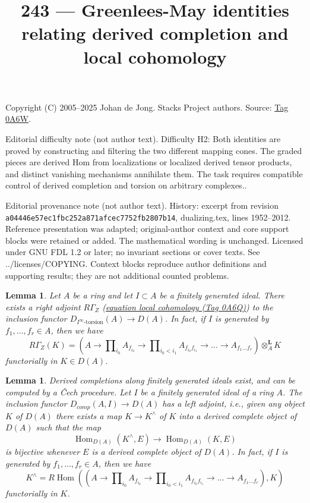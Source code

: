 \documentclass{amsart}
\newenvironment{slogan}{\comment}{\endcomment}
\theoremstyle{plain}
\newtheorem{lemma}[subsection]{Lemma}
\theoremstyle{definition}
\theoremstyle{remark}
\numberwithin{equation}{subsection}
\def\Hom{\mathop{\mathrm{Hom}}\nolimits}
\begin{document}
\title[Stacks Project, Tag 0A6W]{243 --- Greenlees-May identities relating derived completion and local cohomology}
\maketitle
\noindent Copyright (C) 2005--2025 Johan de Jong. Stacks Project authors. Source: \href{https://stacks.math.columbia.edu/tag/0A6W}{Tag 0A6W}.

\noindent Editorial difficulty note (not author text). Difficulty H2: Both identities are proved by constructing and filtering the two different mapping cones. The graded pieces are derived Hom from localizations or localized derived tensor products, and distinct vanishing mechanisms annihilate them. The task requires compatible control of derived completion and torsion on arbitrary complexes..

\noindent Editorial provenance note (not author text). History: excerpt from revision \texttt{a0444\allowbreak 6e57e\allowbreak c1fbc\allowbreak 252a8\allowbreak 71afc\allowbreak ec775\allowbreak 2fb28\allowbreak 07b14}, dualizing.tex, lines 1952--2012. Reference presentation was adapted; original-author context and core support blocks were retained or added. The mathematical wording is unchanged. Licensed under GNU FDL 1.2 or later; no invariant sections or cover texts. See ../licenses/COPYING. Context blocks reproduce author definitions and supporting results; they are not additional counted problems.

\begin{lemma}
\label{lemma-local-cohomology-adjoint}
Let $A$ be a ring and let $I \subset A$ be a finitely generated ideal.
There exists a right adjoint $R\Gamma_Z$ (\href{https://stacks.math.columbia.edu/tag/0A6Q}{equation local cohomology (Tag 0A6Q)})
to the inclusion functor $D_{I^\infty\text{-torsion}}(A) \to D(A)$.
In fact, if $I$ is generated by $f_1, \ldots, f_r \in A$, then we have
$$
R\Gamma_Z(K) =
(A \to \prod\nolimits_{i_0} A_{f_{i_0}} \to
\prod\nolimits_{i_0 < i_1} A_{f_{i_0}f_{i_1}}
\to \ldots \to A_{f_1\ldots f_r}) \otimes_A^\mathbf{L} K
$$
functorially in $K \in D(A)$.
\end{lemma}

\begin{lemma}
\label{more-algebra-lemma-derived-completion}
\begin{slogan}
Derived completions along finitely generated ideals exist, and can
be computed by a {\v C}ech procedure.
\end{slogan}
Let $I$ be a finitely generated ideal of a ring $A$.
The inclusion functor $D_{comp}(A, I) \to D(A)$ has a
left adjoint, i.e., given any object $K$ of $D(A)$ there
exists a map $K \to K^\wedge$ of $K$ into a derived complete
object of $D(A)$ such that the map
$$
\Hom_{D(A)}(K^\wedge, E) \longrightarrow \Hom_{D(A)}(K, E)
$$
is bijective whenever $E$ is a derived complete object of $D(A)$.
In fact, if $I$ is generated by $f_1, \ldots, f_r \in A$, then we have
$$
K^\wedge = R\Hom\left((A \to \prod\nolimits_{i_0} A_{f_{i_0}} \to
\prod\nolimits_{i_0 < i_1} A_{f_{i_0}f_{i_1}}
\to \ldots \to A_{f_1\ldots f_r}), K\right)
$$
functorially in $K$.
\end{lemma}
\end{document}
